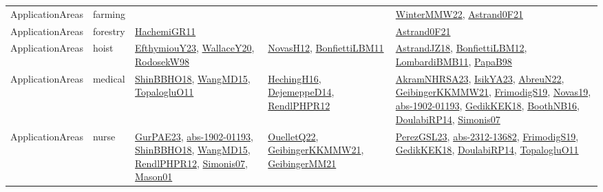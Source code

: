 {\begin{longtable}{llp{6cm}p{6cm}p{6cm}}
ApplicationAreas & farming &  &  & \href{papers/WinterMMW22.pdf}{WinterMMW22}\cite{WinterMMW22}, \href{papers/Astrand0F21.pdf}{Astrand0F21}\cite{Astrand0F21}\\
ApplicationAreas & forestry & \href{articles/HachemiGR11.pdf}{HachemiGR11}\cite{HachemiGR11} &  & \href{papers/Astrand0F21.pdf}{Astrand0F21}\cite{Astrand0F21}\\
ApplicationAreas & hoist & \href{papers/EfthymiouY23.pdf}{EfthymiouY23}\cite{EfthymiouY23}, \href{articles/WallaceY20.pdf}{WallaceY20}\cite{WallaceY20}, \href{papers/RodosekW98.pdf}{RodosekW98}\cite{RodosekW98} & \href{articles/NovasH12.pdf}{NovasH12}\cite{NovasH12}, \href{papers/BonfiettiLBM11.pdf}{BonfiettiLBM11}\cite{BonfiettiLBM11} & \href{papers/AstrandJZ18.pdf}{AstrandJZ18}\cite{AstrandJZ18}, \href{papers/BonfiettiLBM12.pdf}{BonfiettiLBM12}\cite{BonfiettiLBM12}, \href{papers/LombardiBMB11.pdf}{LombardiBMB11}\cite{LombardiBMB11}, \href{articles/PapaB98.pdf}{PapaB98}\cite{PapaB98}\\
ApplicationAreas & medical & \href{articles/ShinBBHO18.pdf}{ShinBBHO18}\cite{ShinBBHO18}, \href{articles/WangMD15.pdf}{WangMD15}\cite{WangMD15}, \href{articles/TopalogluO11.pdf}{TopalogluO11}\cite{TopalogluO11} & \href{papers/HechingH16.pdf}{HechingH16}\cite{HechingH16}, \href{papers/DejemeppeD14.pdf}{DejemeppeD14}\cite{DejemeppeD14}, \href{papers/RendlPHPR12.pdf}{RendlPHPR12}\cite{RendlPHPR12} & \href{articles/AkramNHRSA23.pdf}{AkramNHRSA23}\cite{AkramNHRSA23}, \href{articles/IsikYA23.pdf}{IsikYA23}\cite{IsikYA23}, \href{articles/AbreuN22.pdf}{AbreuN22}\cite{AbreuN22}, \href{papers/GeibingerKKMMW21.pdf}{GeibingerKKMMW21}\cite{GeibingerKKMMW21}, \href{papers/FrimodigS19.pdf}{FrimodigS19}\cite{FrimodigS19}, \href{articles/Novas19.pdf}{Novas19}\cite{Novas19}, \href{articles/abs-1902-01193.pdf}{abs-1902-01193}\cite{abs-1902-01193}, \href{articles/GedikKEK18.pdf}{GedikKEK18}\cite{GedikKEK18}, \href{papers/BoothNB16.pdf}{BoothNB16}\cite{BoothNB16}, \href{papers/DoulabiRP14.pdf}{DoulabiRP14}\cite{DoulabiRP14}, \href{articles/Simonis07.pdf}{Simonis07}\cite{Simonis07}\\
ApplicationAreas & nurse & \href{articles/GurPAE23.pdf}{GurPAE23}\cite{GurPAE23}, \href{articles/abs-1902-01193.pdf}{abs-1902-01193}\cite{abs-1902-01193}, \href{articles/ShinBBHO18.pdf}{ShinBBHO18}\cite{ShinBBHO18}, \href{articles/WangMD15.pdf}{WangMD15}\cite{WangMD15}, \href{papers/RendlPHPR12.pdf}{RendlPHPR12}\cite{RendlPHPR12}, \href{articles/Simonis07.pdf}{Simonis07}\cite{Simonis07}, \href{articles/Mason01.pdf}{Mason01}\cite{Mason01} & \href{papers/OuelletQ22.pdf}{OuelletQ22}\cite{OuelletQ22}, \href{papers/GeibingerKKMMW21.pdf}{GeibingerKKMMW21}\cite{GeibingerKKMMW21}, \href{papers/GeibingerMM21.pdf}{GeibingerMM21}\cite{GeibingerMM21} & \href{papers/PerezGSL23.pdf}{PerezGSL23}\cite{PerezGSL23}, \href{articles/abs-2312-13682.pdf}{abs-2312-13682}\cite{abs-2312-13682}, \href{papers/FrimodigS19.pdf}{FrimodigS19}\cite{FrimodigS19}, \href{articles/GedikKEK18.pdf}{GedikKEK18}\cite{GedikKEK18}, \href{papers/DoulabiRP14.pdf}{DoulabiRP14}\cite{DoulabiRP14}, \href{articles/TopalogluO11.pdf}{TopalogluO11}\cite{TopalogluO11}\\

\end{longtable}}
